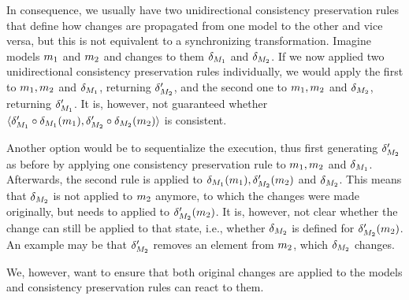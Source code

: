 In consequence, we usually have two unidirectional consistency preservation rules that define how changes are propagated from one model to the other and vice versa, but this is not equivalent to a synchronizing transformation.
Imagine models $m_{1}$ and $m_{2}$ and changes to them $\delta_{M_{1}}$ and $\delta_{M_{2}}$.
If we now applied two unidirectional consistency preservation rules individually, we would apply the first to $m_{1},m_{2}$ and $\delta_{M_{1}}$, returning $\delta_{M_{2}}'$, and the second one to $m_{1},m_{2}$ and $\delta_{M_{2}}$, returning $\delta_{M_{1}}'$.
It is, however, not guaranteed whether $\langle \delta_{M_{1}}' \circ \delta_{M_{1}}(m_{1}), \delta_{M_{2}}' \circ \delta_{M_{2}}(m_{2}) \rangle$ is consistent.

Another option would be to sequentialize the execution, thus first generating $\delta_{M_{2}}'$ as before by applying one consistency preservation rule to $m_{1},m_{2}$ and $\delta_{M_{1}}$.
Afterwards, the second rule is applied to $\delta_{M_{1}}(m_{1}),\delta_{M_{2}}'(m_{2})$ and $\delta_{M_{2}}$.
This means that $\delta_{M_{2}}$ is not applied to $m_{2}$ anymore, to which the changes were made originally, but needs to applied to $\delta_{M_{2}}'(m_{2})$.
It is, however, not clear whether the change can still be applied to that state, i.e., whether $\delta_{M_{2}}$ is defined for $\delta_{M_{2}}'(m_{2})$.
An example may be that $\delta_{M_{2}}'$ removes an element from $m_{2}$, which $\delta_{M_{2}}$ changes.

We, however, want to ensure that both original changes are applied to the models and consistency preservation rules can react to them.

